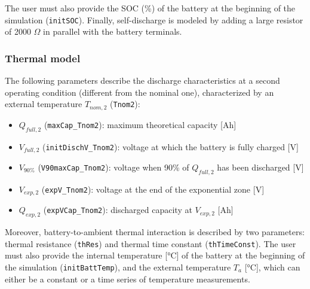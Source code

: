 The user must also provide the SOC (\%) of the battery at the beginning of the simulation (\texttt{initSOC}). Finally, self-discharge is modeled by adding a large resistor of 2000 $\Omega$ in parallel with the battery terminals.

\subsubsection{Thermal model}
\label{sec:thermal_model}
The following parameters describe the discharge characteristics at a second operating condition (different from the nominal one), characterized by an external temperature $T_{nom,2}$ (\texttt{Tnom2}):
\begin{itemize}
\item $Q_{full,2}$ (\texttt{maxCap\_Tnom2}): maximum theoretical capacity [Ah]
\item $V_{full,2}$ (\texttt{initDischV\_Tnom2}): voltage at which the battery is fully charged [V]
\item $V_{90\%}$ (\texttt{V90maxCap\_Tnom2}): voltage when 90\% of $Q_{full,2}$ has been discharged [V]
\item $V_{exp,2}$ (\texttt{expV\_Tnom2}): voltage at the end of the exponential zone [V]
\item $Q_{exp,2}$ (\texttt{expVCap\_Tnom2}): discharged capacity at $V_{exp,2}$ [Ah]
\end{itemize}

Moreover, battery-to-ambient thermal interaction is described by two parameters: thermal resistance (\texttt{thRes}) and thermal time constant (\texttt{thTimeConst}). The user must also provide the internal temperature [°C] of the battery at the beginning of the simulation (\texttt{initBattTemp}), and the external temperature $T_a$ [°C], which can either be a constant or a time series of temperature measurements.

